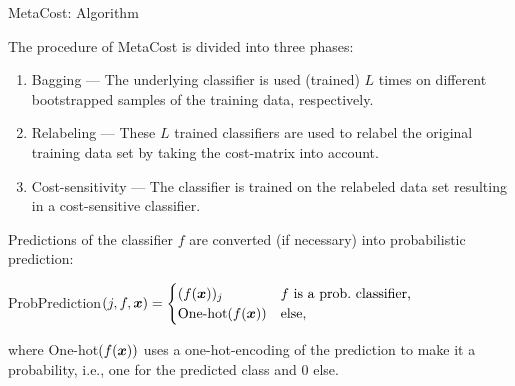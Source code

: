 \begin{vbframe}{MetaCost: Algorithm}
	
	\scriptsize{
%		
 	The procedure of MetaCost is divided into three phases:
		\begin{minipage}{0.53\textwidth} 
%				
				\begin{enumerate}
%					
					\scriptsize
					\item Bagging --- The underlying classifier is used (trained) $L$ times on different bootstrapped samples of the training data, respectively.
%					
					\item Relabeling --- These $L$ trained classifiers are used to relabel the original training data set by taking the cost-matrix into account.
%					
					\item Cost-sensitivity ---  The classifier is trained on the relabeled data set resulting in a cost-sensitive classifier.
%					
				\end{enumerate}
%
	\scriptsize
	\lz 
			Predictions of the classifier $f$ are converted (if necessary) into probabilistic prediction:
			\begin{center}
				\tiny
							ProbPrediction$(j,f,\bm{x}) = \begin{cases}
					(f(\bm{x}))_j & \mbox{$f$ is a prob.\ classifier,} \\
					\mbox{One-hot$(f(\bm{x}))$}& \mbox{else,}
				\end{cases}$
			\end{center}
%		
		\scriptsize
		where One-hot$(f(\bm{x}))$ uses a one-hot-encoding of the prediction to make it a probability, i.e., one for the predicted class and 0 else. 
		\end{minipage}
		\begin{minipage}{0.45\textwidth} 
			\begin{algorithmic}
				

\end{algorithmic}
\end{minipage}}
\end{vbframe}
